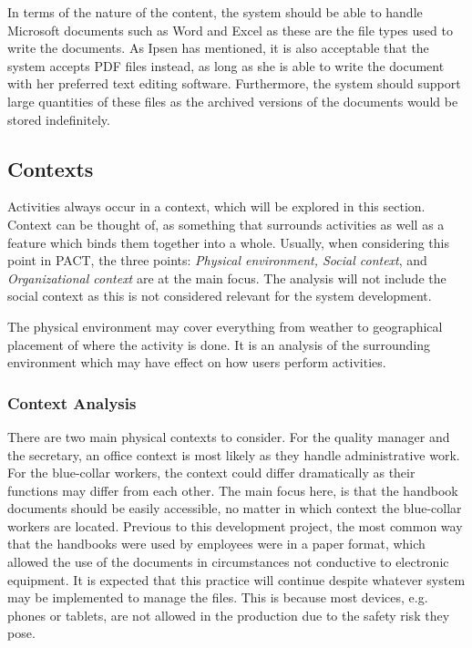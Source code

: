 In terms of the nature of the content, the system should be able to handle Microsoft documents such as Word and Excel as these are the file types used to write the documents.
As Ipsen has mentioned, it is also acceptable that the system accepts PDF files instead, as long as she is able to write the document with her preferred text editing software.
Furthermore, the system should support large quantities of these files as the archived versions of the documents would be stored indefinitely.

\subsection{Contexts}\label{sec:pactcontext}
Activities always occur in a context, which will be explored in this section.
Context can be thought of, as something that surrounds activities as well as a feature which binds them together into a whole.
Usually, when considering this point in PACT, the three points: \textit{Physical environment, Social context}, and \textit{Organizational context} are at the main focus.
The analysis will not include the social context as this is not considered relevant for the system development.

The physical environment may cover everything from weather to geographical placement of where the activity is done.
It is an analysis of the surrounding environment which may have effect on how users perform activities.

\subsubsection*{Context Analysis}
There are two main physical contexts to consider.
For the quality manager and the secretary, an office context is most likely as they handle administrative work.
For the blue-collar workers, the context could differ dramatically as their functions may differ from each other.
The main focus here, is that the handbook documents should be easily accessible, no matter in which context the blue-collar workers are located.
Previous to this development project, the most common way that the handbooks were used by employees were in a paper format, which allowed the use of the documents in circumstances not conductive to electronic equipment.
It is expected that this practice will continue despite whatever system may be implemented to manage the files.
This is because most devices, e.g. phones or tablets, are not allowed in the production due to the safety risk they pose.

